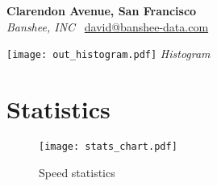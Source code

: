 \documentclass[letterpaper]{article}
\begin{document}
\begin{center}
    {\huge \textbf{ Clarendon Avenue, San Francisco}}\\
    \vspace{0.1cm}
    {\large \textit{Banshee, INC } \textbullet \ \href{mailto:david@banshee-data.com}{david@banshee-data.com}}
\end{center}

\begin{multicols}{2}

\lipsum[1-2]
\begin{center}
    \texttt{[image: out\_histogram.pdf]} %
    \textit{Histogram}
\end{center}




\section*{Statistics}

\vspace{0.5cm}


\end{multicols}

\begin{center}
\begin{figure}[ht]
    \centering
    \texttt{[image: stats\_chart.pdf]}
    \caption{Speed statistics}
\end{figure}
\end{center}
\end{document}
